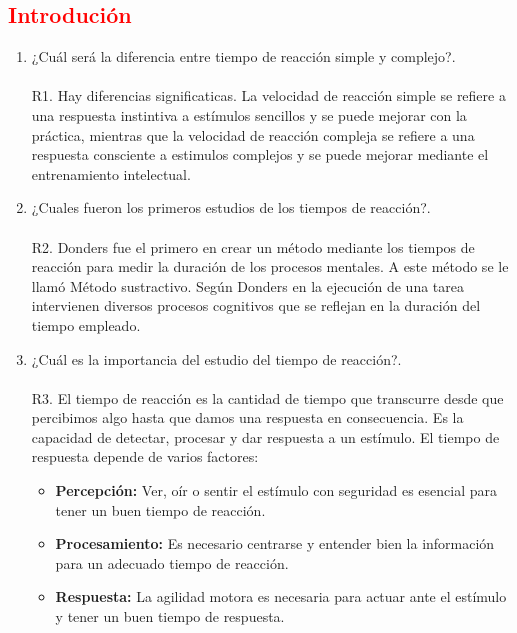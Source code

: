 \documentclass[11pt]{article}
\begin{document}
    \begin{multicols}{2}
        \section{\textbf{\textcolor{red}{Introdución}}}
        \begin{enumerate}
            \item ¿Cuál será la diferencia entre tiempo de reacción
            simple y complejo?.\\\\
            R1. Hay diferencias significaticas. La velocidad de reacción simple se refiere a una respuesta instintiva a estímulos sencillos y se puede mejorar con la práctica, mientras que la velocidad de reacción compleja se refiere a una respuesta consciente a estimulos complejos y se puede mejorar mediante el entrenamiento intelectual.
            \item ¿Cuales fueron los primeros estudios de los tiempos de reacción?.\\\\
            R2. Donders fue el primero en crear un método mediante los tiempos de reacción para medir la duración de los procesos mentales. A este método se le llamó Método sustractivo. Según Donders en la ejecución de una tarea intervienen diversos procesos cognitivos que se reflejan en la duración del tiempo empleado.
            \item ¿Cuál es la importancia del estudio del tiempo de reacción?.\\\\
            R3. El tiempo de reacción es la cantidad de tiempo que transcurre desde que percibimos algo hasta que damos una respuesta en consecuencia. Es la capacidad de detectar, procesar y dar respuesta a un estímulo. El tiempo de respuesta depende de varios factores:
            \begin{itemize}
                \item \textbf{Percepción:} Ver, oír o sentir el estímulo con seguridad es esencial para tener un buen tiempo de reacción.
                \item \textbf{Procesamiento:} Es necesario centrarse y entender bien la información para un adecuado tiempo de reacción.
                \item \textbf{Respuesta:} La agilidad motora es necesaria para actuar ante el estímulo y tener un buen tiempo de respuesta.
            \end{itemize}


\end{enumerate}
\end{multicols}
\end{document}
